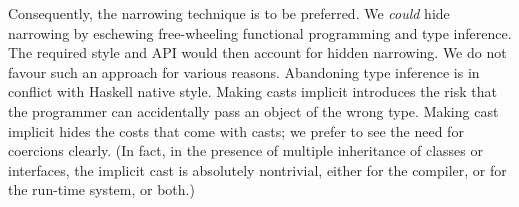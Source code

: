 Consequently, the narrowing technique is to be preferred.  We
\emph{could} hide narrowing by eschewing free-wheeling functional
programming and type inference. The required style and API would then
account for hidden narrowing. We do not favour such an approach for
various reasons. Abandoning type inference is in conflict with Haskell
native style.  Making casts implicit introduces the risk that the
programmer can accidentally pass an object of the wrong type.  Making
cast implicit hides the costs that come with casts; we prefer to see
the need for coercions clearly. (In fact, in the presence of multiple
inheritance of classes or interfaces, the implicit cast is absolutely
nontrivial, either for the compiler, or for the run-time system, or
both.)



